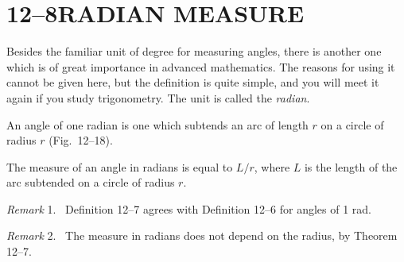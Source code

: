 \documentclass[11pt]{book}
\theoremstyle{bkplain}
\theoremstyle{XIplainnote}
\theoremstyle{bkplain}
\newenvironment{XIIremarkn}[1]{\par\medskip\noindent\emph{Remark} #1.\ }%
  {\par\medskip}
\theoremstyle{bkplain}
\begin{document}
\section*{12--8\quad RADIAN MEASURE}

Besides the familiar unit of degree for measuring angles, there is another one
which is of great importance in advanced mathematics. The reasons for using it
cannot be given here, but the definition is quite simple, and you will meet it
again if you study trigonometry. The unit is called the \emph{radian}.

\begin{definition}
An angle of one radian is one which subtends an arc of length $r$ on a circle of
radius $r$ (Fig.~12--18).
\end{definition}

\begin{definition}
The measure of an angle in radians is equal to $L/r$, where $L$ is the length of
the arc subtended on a circle of radius $r$.
\end{definition}

\begin{XIIremarkn}{1}
Definition 12--7 agrees with Definition 12--6 for angles of 1 rad.
\end{XIIremarkn}

\begin{XIIremarkn}{2}
The measure in radians does not depend on the radius, by Theorem 12--7.
\end{XIIremarkn}
\end{document}
